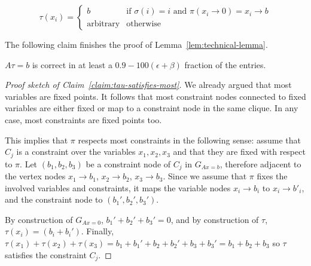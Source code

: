 \documentclass[a4paper,twoside,justified]{tufte-handout}
\newcommand{\Glin}[1]{G_{Ax=#1}}
\begin{document}
\begin{equation}
  \label{eq:define-tau}
  \tau(x_i)=
\begin{cases}
  b &\text{if $\sigma(i)=i$ and $\pi(x_i\to 0)=x_i\to b$}\\
  \text{arbitrary} &\text{otherwise}
\end{cases}
\end{equation}

The following claim finishes the proof of Lemma~\ref{lem:technical-lemma}.

\begin{claim}
  \label{claim:tau-satisfies-most}
  $A\tau = b$ is correct in at least a $0.9-100(\epsilon + \beta)$ fraction of the entries.
\end{claim}
\begin{proof}[Proof sketch of Claim~\ref{claim:tau-satisfies-most}]

We already argued that most variables are fixed points. It follows that most constraint nodes connected to fixed variables are either fixed or map to a constraint node in the same clique. In any case, most constraints are fixed points too.

This implies that $\pi$ respects most constraints in the following sense: assume that $C_j$ is a constraint over the variables $x_1,x_2,x_3$ and that they are fixed with respect to $\pi$. Let $(b_1,b_2,b_3)$ be a constraint node of $C_j$ in $\Glin{b}$, therefore adjacent to the vertex nodes $x_1\to b_1$, $x_2\to b_2$, $x_3 \to b_3$. Since we assume that $\pi$ fixes the involved variables and constraints, it maps the variable nodes $x_i\to b_i$ to $x_i \to b'_i$, and the constraint node to $(b_1',b_2',b_3')$.

By construction of $\Glin{0}$, $b_1'+b_2'+b_3'=0$, and by construction of $\tau$, $\tau(x_i)=(b_i + b_i')$. Finally, $\tau(x_1)+\tau(x_2)+\tau(x_3) = b_1 + b_1' + b_2 + b_2' + b_3 + b_3' = b_1 + b_2 + b_3$ so $\tau$ satisfies the constraint $C_j$.

\end{proof}



\end{document}
